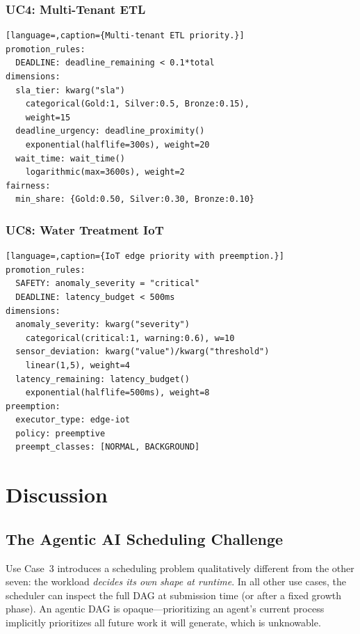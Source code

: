 \documentclass[conference]{IEEEtran}
\begin{document}
\subsubsection{UC4: Multi-Tenant ETL}

\begin{lstlisting}[language=,caption={Multi-tenant ETL priority.}]
promotion_rules:
  DEADLINE: deadline_remaining < 0.1*total
dimensions:
  sla_tier: kwarg("sla")
    categorical(Gold:1, Silver:0.5, Bronze:0.15),
    weight=15
  deadline_urgency: deadline_proximity()
    exponential(halflife=300s), weight=20
  wait_time: wait_time()
    logarithmic(max=3600s), weight=2
fairness:
  min_share: {Gold:0.50, Silver:0.30, Bronze:0.10}
\end{lstlisting}

\subsubsection{UC8: Water Treatment IoT}

\begin{lstlisting}[language=,caption={IoT edge priority with preemption.}]
promotion_rules:
  SAFETY: anomaly_severity = "critical"
  DEADLINE: latency_budget < 500ms
dimensions:
  anomaly_severity: kwarg("severity")
    categorical(critical:1, warning:0.6), w=10
  sensor_deviation: kwarg("value")/kwarg("threshold")
    linear(1,5), weight=4
  latency_remaining: latency_budget()
    exponential(halflife=500ms), weight=8
preemption:
  executor_type: edge-iot
  policy: preemptive
  preempt_classes: [NORMAL, BACKGROUND]
\end{lstlisting}

\section{Discussion}
\label{sec:discussion}

\subsection{The Agentic AI Scheduling Challenge}

Use Case~3 introduces a scheduling problem qualitatively different from the other seven: the workload \emph{decides its own shape at runtime}. In all other use cases, the scheduler can inspect the full DAG at submission time (or after a fixed growth phase). An agentic DAG is opaque---prioritizing an agent's current process implicitly prioritizes all future work it will generate, which is unknowable.
\end{document}
